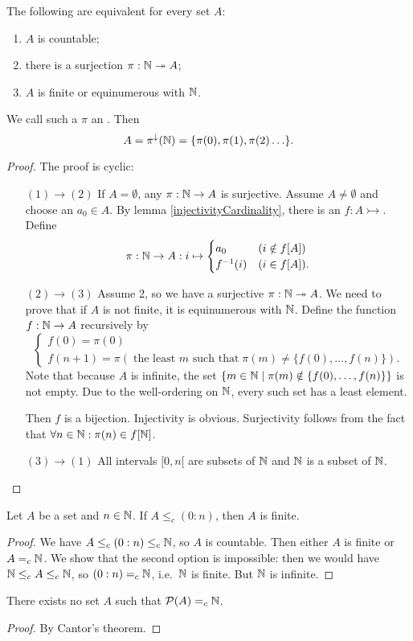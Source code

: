 \begin{proposition} \label{countableEquivalents}
The following are equivalent for every set $A$:
\begin{enumerate}
\item $A$ is countable;
\item there is a surjection $\pi:\mathbb{N}\twoheadrightarrow A$;
\item $A$ is finite or equinumerous with $\mathbb{N}$.
\end{enumerate}
We call such a $\pi$ an . Then
\[ A = \pi^\downarrow(\mathbb{N}) = \{\pi(0),\pi(1),\pi(2) \ldots \}. \]
\end{proposition}
\begin{proof}
The proof is cyclic:
\begin{enumerate}[leftmargin=2cm]
\item[$\boxed{(1)\rightarrow (2)}$] If $A = \emptyset$, any $\pi:\mathbb{N}\to A$ is surjective. Assume $A\neq \emptyset$ and choose an $a_0\in A$. By lemma \ref{injectivityCardinality}, there is an $f:A\rightarrowtail$. Define
\[ \pi: \mathbb{N}\to A: i\mapsto \begin{cases}
a_0 & (i\notin f[A]) \\ f^{-1}(i) & (i\in f[A]).
\end{cases} \]
\item[$\boxed{(2)\rightarrow (3)}$] Assume 2, so we have a surjective $\pi:\mathbb{N}\twoheadrightarrow A$. We need to prove that if $A$ is not finite, it is equinumerous with $\mathbb{N}$. Define the function $f:\mathbb{N}\to A$ recursively by
\[ \begin{cases}
f(0) = \pi(0) \\
f(n+1) = \pi\left(\;\text{the least $m$ such that}\; \pi(m)\neq \{f(0),\ldots,f(n)\}\right).
\end{cases} \]
Note that because $A$ is infinite, the set $\left\{ m\in\mathbb{N} \;\middle|\; \pi(m)\notin \{ f(0),\ldots,f(n) \} \right\}$ is not empty. Due to the well-ordering on $\mathbb{N}$, every such set has a least element.

Then $f$ is a bijection. Injectivity is obvious. Surjectivity follows from the fact that $\forall n\in \mathbb{N}: \pi(n)\in f[\mathbb{N}]$.
\item[$\boxed{(3)\rightarrow (1)}$] All intervals $[0, n[$ are subsets of $\mathbb{N}$ and $\mathbb{N}$ is a subset of $\mathbb{N}$.
\end{enumerate}
\end{proof}
\begin{corollary} \label{finiteComparisonWithInterval}
Let $A$ be a set and $n\in \mathbb{N}$. If $A\leq_c (0:n)$, then $A$ is finite.
\end{corollary}
\begin{proof}
We have $A \leq_c (0:n) \leq_c \mathbb{N}$, so $A$ is countable. Then either $A$ is finite or $A =_c \mathbb{N}$. We show that the second option is impossible: then we would have $\mathbb{N} \leq_c A \leq_c \mathbb{N}$, so $(0:n) =_c \mathbb{N}$, i.e.\ $\mathbb{N}$ is finite. But $\mathbb{N}$ is infinite.
\end{proof}
\begin{corollary}
There exists no set $A$ such that $\operatorname{\mathcal{P}}(A) =_c \mathbb{N}$.
\end{corollary}
\begin{proof}
By Cantor's theorem.
\end{proof}

